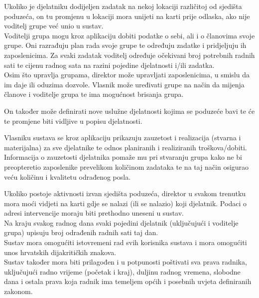 		Ukoliko je djelatniku dodijeljen zadatak na nekoj lokaciji različitoj od sjedišta poduzeća, on tu promjenu u lokaciji mora unijeti na karti prije odlaska, ako nije voditelj grupe već unio u sustav.\\
		
		Voditelji grupa mogu kroz aplikaciju dobiti podatke o sebi, ali i o članovima svoje grupe. Oni razrađuju plan rada svoje grupe te određuju zadatke i pridjeljuju ih zaposlenicima. Za svaki zadatak voditelj određuje očekivani broj potrebnih radnih sati te cijenu radnog sata na razini pojedine djelatnosti i/ili zadatka. \\
		
		Osim što upravlja grupama, direktor može upravljati zaposlenicima, u smislu da im daje ili oduzima dozvole. Vlasnik može uređivati grupe na način da mijenja članove i voditelje grupa te ima mogućnost brisanja grupa.  
	
		On također može definirati nove uslužne djelatnosti kojima se poduzeće bavi te će te promjene biti vidljive u popisu djelatnosti.  
	
		Vlasniku sustava se kroz aplikaciju prikazuju zauzetost i realizacija (stvarna i materijalna) za sve djelatnike te odnos planiranih i realiziranih troškova/dobiti. Informacija o zauzetosti djelatnika pomaže mu pri stvaranju grupa kako ne bi preopteretio zaposlenike prevelikom količinom zadataka te na taj način osigurao veću količinu i kvalitetu odrađenog posla. 
	
		Ukoliko postoje aktivnosti izvan sjedišta poduzeća, direktor u svakom trenutku mora moći vidjeti na karti gdje se nalazi (ili se nalazio) koji djelatnik. Podaci o adresi intervencije moraju biti prethodno uneseni u sustav. \\
		
		Na kraju svakog radnog dana svaki pojedini djelatnik (uključujući i voditelje grupa) upisuju broj odrađenih radnih sati taj dan.\\
		
		Sustav mora omogućiti istovremeni rad svih korisnika sustava i mora omogućiti unos hrvatskih dijakritičkih znakova.\\
		
		Sustav također mora biti prilagođen i u potpunosti poštivati sva prava radnika, uključujući radno vrijeme (početak i kraj), duljinu radnog vremena, slobodne dana i ostala prava koja radnik ima temeljem općih i posebnih uvjeta definiranih zakonom.\\
		
